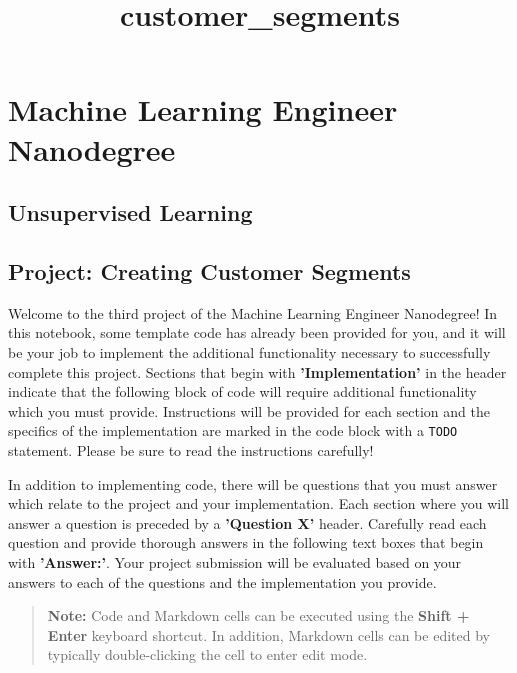 \documentclass[11pt]{article}
\title{customer\_segments}
\begin{document}
    
    
    \maketitle
    
    

    
    \section{Machine Learning Engineer
Nanodegree}\label{machine-learning-engineer-nanodegree}

\subsection{Unsupervised Learning}\label{unsupervised-learning}

\subsection{Project: Creating Customer
Segments}\label{project-creating-customer-segments}

    Welcome to the third project of the Machine Learning Engineer
Nanodegree! In this notebook, some template code has already been
provided for you, and it will be your job to implement the additional
functionality necessary to successfully complete this project. Sections
that begin with \textbf{'Implementation'} in the header indicate that
the following block of code will require additional functionality which
you must provide. Instructions will be provided for each section and the
specifics of the implementation are marked in the code block with a
\texttt{\textquotesingle{}TODO\textquotesingle{}} statement. Please be
sure to read the instructions carefully!

In addition to implementing code, there will be questions that you must
answer which relate to the project and your implementation. Each section
where you will answer a question is preceded by a \textbf{'Question X'}
header. Carefully read each question and provide thorough answers in the
following text boxes that begin with \textbf{'Answer:'}. Your project
submission will be evaluated based on your answers to each of the
questions and the implementation you provide.

\begin{quote}
\textbf{Note:} Code and Markdown cells can be executed using the
\textbf{Shift + Enter} keyboard shortcut. In addition, Markdown cells
can be edited by typically double-clicking the cell to enter edit mode.
\end{quote}
\end{document}
